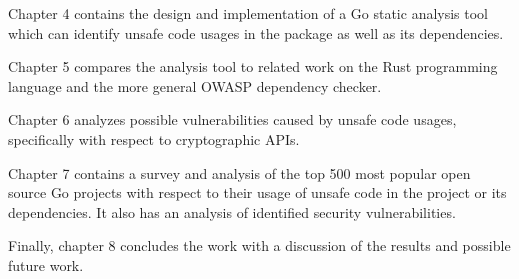 Chapter 4 contains the design and implementation of a Go static analysis tool which can identify
unsafe code usages in the package as well as its dependencies.

Chapter 5 compares the analysis tool to related work on the Rust programming language and the
more general OWASP dependency checker.

Chapter 6 analyzes possible vulnerabilities caused by unsafe code usages, specifically with
respect to cryptographic APIs.

Chapter 7 contains a survey and analysis of the top 500 most popular open source Go projects
with respect to their usage of unsafe code in the project or its dependencies. It also has an
analysis of identified security vulnerabilities.

Finally, chapter 8 concludes the work with a discussion of the results and possible future work.


